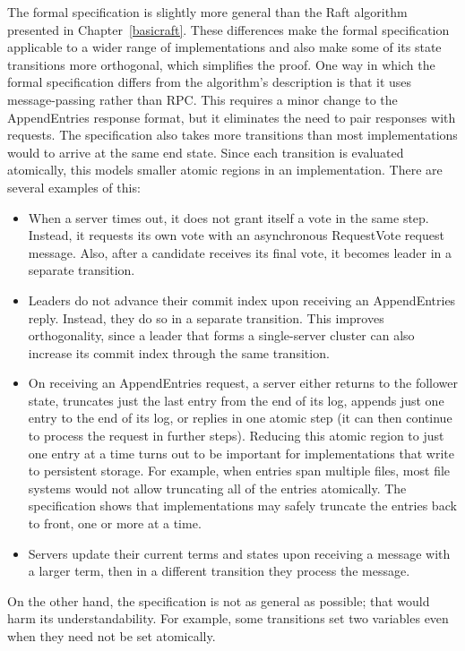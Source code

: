 The formal specification is slightly more general than the Raft
algorithm presented in Chapter~\ref{basicraft}. These differences make
the formal specification applicable to a wider range of implementations
and also make some of its state transitions more orthogonal, which
simplifies the proof. One way in which the formal specification differs
from the algorithm's description is that it uses message-passing rather
than RPC. This requires a minor change to the AppendEntries response
format, but it eliminates the need to pair responses with requests.
The specification also takes more transitions than most
implementations would to arrive at the same end state. Since each
transition is evaluated atomically, this models smaller atomic regions
in an implementation. There are several examples of this:
%
\begin{itemize}
%
\item When a server times out, it does not grant itself a vote in the
same step. Instead, it requests its own vote with an asynchronous
RequestVote request message. Also, after a candidate receives its final
vote, it becomes leader in a separate transition.
%
\item Leaders do not advance their commit index upon receiving an
AppendEntries reply. Instead, they do so in a separate transition. This
improves orthogonality, since a leader that forms a single-server
cluster can also increase its commit index through the same transition.
%
%
\item On receiving an AppendEntries request, a server either returns to
the follower state, truncates just the last entry from the end of its
log, appends just one entry to the end of its log, or replies in one
atomic step (it can then continue to process the request in further
steps). Reducing
this atomic region to just one entry at a time turns out to be important
for implementations that write to persistent storage. For example, when
entries span multiple files, most file systems would not allow
truncating all of the entries atomically. The specification shows that
implementations may safely truncate the entries back to front, one or
more at a time.
%
\item Servers update their current terms and states upon receiving a
message with a larger term, then in a different transition they process
the message.
%
\end{itemize}
%
On the other hand, the specification is not as general as possible; that
would harm its understandability. For example, some transitions set two
variables even when they need not be set atomically.

